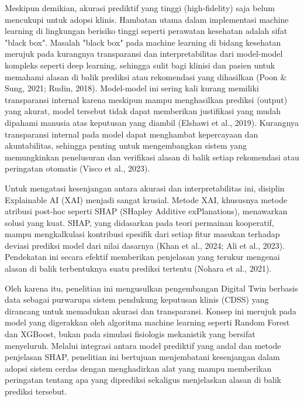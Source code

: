 Meskipun demikian, akurasi prediktif yang tinggi (high-fidelity) saja belum mencukupi untuk adopsi klinis. Hambatan utama dalam implementasi machine learning di lingkungan berisiko tinggi seperti perawatan kesehatan adalah sifat "black box". Masalah "black box" pada machine learning di bidang kesehatan merujuk pada kurangnya transparansi dan interpretabilitas dari model-model kompleks seperti deep learning, sehingga sulit bagi klinisi dan pasien untuk memahami alasan di balik prediksi atau rekomendasi yang dihasilkan (Poon \& Sung, 2021; Rudin, 2018). Model-model ini sering kali kurang memiliki transparansi internal karena meskipun mampu menghasilkan prediksi (output) yang akurat, model tersebut tidak dapat memberikan justifikasi yang mudah dipahami manusia atas keputusan yang diambil (Elshawi et al., 2019). Kurangnya transparansi internal pada model dapat menghambat kepercayaan dan akuntabilitas, sehingga penting untuk mengembangkan sistem yang memungkinkan penelusuran dan verifikasi alasan di balik setiap rekomendasi atau peringatan otomatis (Visco et al., 2023).

Untuk mengatasi kesenjangan antara akurasi dan interpretabilitas ini, disiplin Explainable AI (XAI) menjadi sangat krusial. Metode XAI, khususnya metode atribusi post-hoc seperti SHAP (SHapley Additive exPlanations), menawarkan solusi yang kuat. SHAP, yang didasarkan pada teori permainan kooperatif, mampu mengkalkulasi kontribusi spesifik dari setiap fitur masukan terhadap deviasi prediksi model dari nilai dasarnya (Khan et al., 2024; Ali et al., 2023). Pendekatan ini secara efektif memberikan penjelasan yang terukur mengenai alasan di balik terbentuknya suatu prediksi tertentu (Nohara et al., 2021).

Oleh karena itu, penelitian ini mengusulkan pengembangan Digital Twin berbasis data sebagai purwarupa sistem pendukung keputusan klinis (CDSS) yang dirancang untuk memadukan akurasi dan transparansi. Konsep ini merujuk pada model yang digerakkan oleh algoritma machine learning seperti Random Forest dan XGBoost, bukan pada simulasi fisiologis mekanistik yang bersifat menyeluruh. Melalui integrasi antara model prediktif yang andal dan metode penjelasan SHAP, penelitian ini bertujuan menjembatani kesenjangan dalam adopsi sistem cerdas dengan menghadirkan alat yang mampu memberikan peringatan tentang apa yang diprediksi sekaligus menjelaskan alasan di balik prediksi tersebut.

